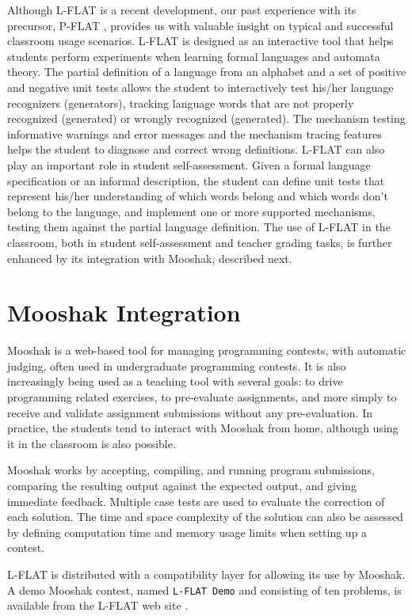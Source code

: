 \documentclass{llncs}
\begin{document}
Although L-FLAT is a recent development, our past experience with its precursor, P-FLAT \cite{wermelinger+dias,pflat}, provides us with valuable insight on typical and successful classroom usage scenarios. L-FLAT is designed as an interactive tool that helps students perform experiments when learning formal languages and automata theory. The partial definition of a language from an alphabet and a set of positive and negative unit tests allows the student to interactively test his/her language recognizers (generators), tracking language words that are not properly recognized (generated) or wrongly recognized (generated). The mechanism testing informative warnings and error messages and the mechanism tracing features helps the student to diagnose and correct wrong definitions. L-FLAT can also play an important role in student self-assessment. Given a formal language specification or an informal description, the student can define unit tests that represent his/her understanding of which words belong and which words don't belong to the language, and implement one or more supported mechanisms, testing them against the partial language definition. The use of L-FLAT in the classroom, both in student self-assessment and teacher grading tasks, is further enhanced by its integration with Mooshak, described next.

\section{Mooshak Integration}

Mooshak \cite{SPE03} is a web-based tool for managing programming contests, with automatic judging, often used in undergraduate programming contests. It is also increasingly being used as a teaching tool with several goals: to drive programming related exercises, to pre-evaluate assignments, and more simply to receive and validate assignment submissions without any pre-evaluation. In practice, the students tend to interact with Mooshak from home, although using it in the classroom is also possible.

Mooshak works by accepting, compiling, and running program submissions, comparing the resulting output against the expected output, and giving immediate feedback. Multiple case tests are used to evaluate the correction of each solution. The time and space complexity of the solution can also be assessed by defining computation time and memory usage limits when setting up a contest.

L-FLAT is distributed with a compatibility layer for allowing its use by Mooshak. A demo Mooshak contest, named \lstinline{L-FLAT Demo} and consisting of ten problems, is available from the L-FLAT web site \cite{lflat}.
\end{document}
